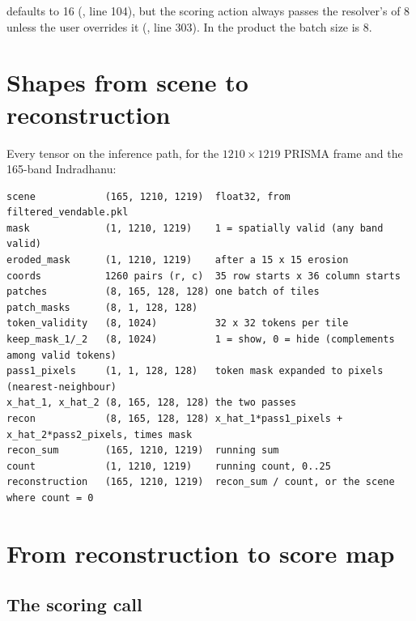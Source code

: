 \begin{sourcenote}
 defaults to 16 (, line 104), but the
scoring action always passes the resolver's  of 8 unless the user overrides it
(, line 303). In the product the batch size is 8.
\end{sourcenote}

\section{Shapes from scene to reconstruction}\label{sec:inference:shapes}

Every tensor on the inference path, for the $1210\times1219$ PRISMA frame and the 165-band Indradhanu:
\begin{lstlisting}
scene            (165, 1210, 1219)  float32, from filtered_vendable.pkl
mask             (1, 1210, 1219)    1 = spatially valid (any band valid)
eroded_mask      (1, 1210, 1219)    after a 15 x 15 erosion
coords           1260 pairs (r, c)  35 row starts x 36 column starts
patches          (8, 165, 128, 128) one batch of tiles
patch_masks      (8, 1, 128, 128)
token_validity   (8, 1024)          32 x 32 tokens per tile
keep_mask_1/_2   (8, 1024)          1 = show, 0 = hide (complements among valid tokens)
pass1_pixels     (1, 1, 128, 128)   token mask expanded to pixels (nearest-neighbour)
x_hat_1, x_hat_2 (8, 165, 128, 128) the two passes
recon            (8, 165, 128, 128) x_hat_1*pass1_pixels + x_hat_2*pass2_pixels, times mask
recon_sum        (165, 1210, 1219)  running sum
count            (1, 1210, 1219)    running count, 0..25
reconstruction   (165, 1210, 1219)  recon_sum / count, or the scene where count = 0
\end{lstlisting}

\section{From reconstruction to score map}\label{sec:inference:toscore}

\subsection{The scoring call}

